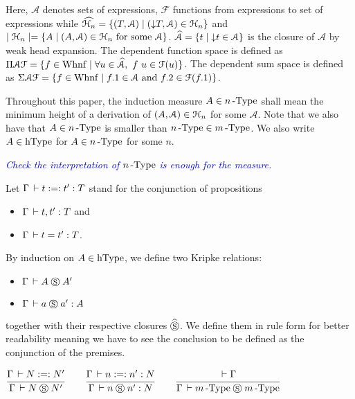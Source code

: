 \documentclass[a4paper,english]{lipics-utf8x}
\newcommand\meta[1]{\noindent\textcolor{blue}{\emph{#1}}}
\begin{document}
  \noindent %
  Here, $\mathcal{A}$ denotes sets of expressions, $\mathcal{F}$ functions from
  expressions to set of expressions while
  $\widehat{\mathcal{H}_n} = \{ (T,\mathcal{A}) \mid ({\downarrow} T, \mathcal{A}) \in \mathcal{H}_n \}$
  and $\mid \mathcal{H}_n \mid = \{ A \mid (A, \mathcal{A}) \in \mathcal{H}_n \text{ for some }
  \mathcal{A} \}$.
  $\widehat{\mathcal{A}} = \{ t \mid {\downarrow} t \in \mathcal{A} \}$ is the closure
  of $\mathcal{A}$ by weak head expansion.
  The dependent function space is defined as
  $\Pi \mathcal{A} \mathcal{F} = \{ f \in \operatorname{Whnf} \mid \forall u \in
  \widehat{\mathcal{A}},\ f~u \in \mathcal{F}(u) \}$.
  The dependent sum space is defined as
  $\Sigma \mathcal{A} \mathcal{F} = \{ f \in \operatorname{Whnf} \mid f.1 \in \mathcal{A}
  \text{ and } f.2 \in \mathcal{F}(f.1) \}$.

  Throughout this paper, the induction measure $A \in n\operatorname{-Type}$ shall mean the
  minimum height of a derivation of $(A, \mathcal{A}) \in \mathcal{H}_n$ for some
  $\mathcal{A}$.
  Note that we also have that $A \in n\operatorname{-Type}$ is smaller than
  $n\operatorname{-Type} \in m\operatorname{-Type}$.
  We also write $A \in \operatorname{hType}$ for $A \in n\operatorname{-Type}$ for some $n$.

  \meta{Check the interpretation of $n\operatorname{-Type}$ is enough for the measure.}

  Let $\Gamma \,\vdash t :=: t' : T$ stand for the conjunction of propositions
  \begin{itemize}
    \item $\Gamma \,\vdash t,t' : T$ and
    \item $\Gamma \,\vdash t = t' : T$.
  \end{itemize}
  By induction on $A \in \operatorname{hType}$, we define two Kripke relations:
  \begin{itemize}
    \item $\Gamma \,\vdash A \mathrel{\circledS} A'$
    \item $\Gamma \,\vdash a \mathrel{\circledS} a' : A$
  \end{itemize}
  together with their respective closures $\mathrel{\widehat{\mathrel{\circledS}}}$.
  We define them in rule form for better readability meaning we have to see the
  conclusion to be defined as the conjunction of the premises.

  \begin{center}
  \(
    \ru{\Gamma \der N :=: N'
      }{\Gamma \der N \Sr N'}
    \qquad
    \ru{\Gamma \der n :=: n' : N
      }{\Gamma \der n \Sr n' : N}
    \qquad
    \ru{\der \Gamma
      }{\Gamma \der \nType{m} \Sr \nType{m}}
  \)
  \end{center}
\end{document}
